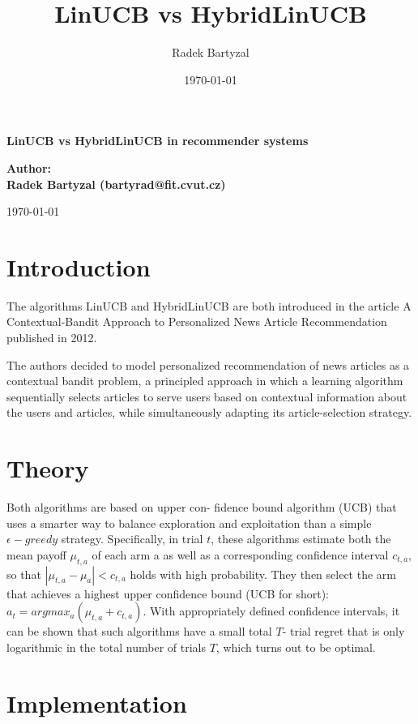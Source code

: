 \documentclass[12pt, titlepage]{article}
\title{LinUCB vs HybridLinUCB}
\date{\today}
\author{Radek Bartyzal}
\begin{document}
\begin{titlepage}
    \centering
    \vfill
    {\bfseries\Huge
        LinUCB vs HybridLinUCB in recommender systems
    }    
    \vfill
        
    
        
    {\bfseries\Large 
    Author:\\
    Radek Bartyzal (bartyrad@fit.cvut.cz)\\
    }    
    \vskip1cm
 
    \vskip1cm
    \today

    
    \vfill
\end{titlepage}

\tableofcontents
\pagebreak

\section{Introduction}\label{sec:intro}
The algorithms LinUCB and HybridLinUCB are both introduced in the article A Contextual-Bandit Approach to
Personalized News Article Recommendation published in 2012.

The authors decided to model personalized recommendation of news
articles as a contextual bandit problem, a principled approach in
which a learning algorithm sequentially selects articles to serve
users based on contextual information about the users and articles,
while simultaneously adapting its article-selection strategy.

\section{Theory}\label{sec:theory}
Both algorithms are based on upper con-
fidence bound algorithm (UCB) that uses a smarter way to balance
exploration and exploitation than a simple $\epsilon-greedy$ strategy. 
Specifically, in trial $t$, these algorithms
estimate both the mean payoff $\mu_{t,a}$ of each arm a as well
as a corresponding confidence interval $c_{t,a}$, so that $|\mu_{t,a} - \mu_a| <
c_{t,a}$ holds with high probability. They then select the arm that
achieves a highest upper confidence bound (UCB for short): $a_t =
arg max_a (\mu_{t,a} + c_{t,a})$. With appropriately defined confidence intervals,
it can be shown that such algorithms have a small total $T$-
trial regret that is only logarithmic in the total number of trials $T$,
which turns out to be optimal.


\section{Implementation}\label{sec:impl}
\end{document}
